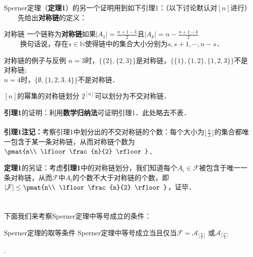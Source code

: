 Sperner定理（\textbf{定理1}）的另一个证明用到如下引理1：（以下讨论默认对$[n]$进行）\\
$\qquad$先给出\textbf{对称链}的定义：

\begin{definition}{对称链}
一个链称为\textbf{对称链}如果$|A_1|=\frac{n+1-k}{2}$且$|A_k|=n-\frac{n+1-k}{2}$\\
$\qquad$
换句话说，存在$s\in \mathbb{N}$使得链中的集合大小分别为$s,s+1,\cdots,n-s$．
\end{definition}

\begin{example}{对称链的例子与反例}
$n=3$时，$\{\{2\},\{2,3\}\}$是对称链，$\{\{1\},\{1,2\},\{1,2,3\}\}$不是对称链;\\
$n=4$时，$\{\emptyset,\{1,2,3,4\}\}$不是对称链．
\end{example}


\begin{lemma}{$[n]$的幂集的对称链划分}
$2^{[n]}$可以划分为不交对称链．
\end{lemma}

\textbf{引理1}的证明：利用\textbf{数学归纳法}可证明引理1．此处略去不表．\\\\
\textbf{引理1注记：}考察引理1中划分出的不交对称链的个数：每个大小为$\lfloor\frac{n}{2}\rfloor$的集合都唯一包含于某一条对称链，从而对称链个数为$\pmat{n\\ \lfloor\frac{n}{2} \rfloor}$．

\textbf{定理1}的另证：考虑\textbf{引理1}中的对称链划分，我们知道每个$A_i\in \mathcal{F}$被包含于唯一一条对称链，从而$\mathcal{F}$中$A_i$的个数不大于对称链的个数，即$|\mathcal{F}|\leq \pmat{n\\ \lfloor\frac{n}{2} \rfloor}$，证毕．\\
\\
\\
下面我们来考察Sperner定理中等号成立的条件：
\begin{theorem}{Sperner定理的取等条件}
Sperner定理中等号成立当且仅当$\mathcal{F}=\mathcal{A}_{\lfloor\frac{n}{2} \rfloor}$ 或$ \mathcal{A}_{\lceil\frac{n}{2} \rceil}$
\end{theorem}.



